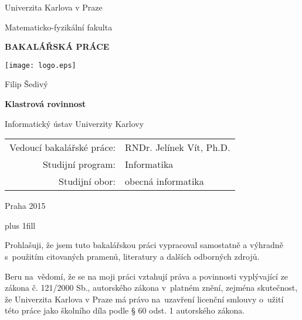 \documentclass[12pt,a4report]{report}
\theoremstyle{definition}
\begin{document}
\author{Filip Šedivý}
\begin{center}

\large

Univerzita Karlova v Praze

\medskip

Matematicko-fyzikální fakulta

\vfill

{\bf\Large BAKALÁŘSKÁ PRÁCE}

\vfill

\centerline{\mbox{\texttt{[image: logo.eps]}}}

\vfill
\vspace{5mm}

{\LARGE Filip Šedivý}

\vspace{15mm}

{\LARGE\bfseries Klastrová rovinnost}

\vfill

Informatický ústav Univerzity Karlovy

\vfill

\begin{tabular}{rl}

Vedoucí bakalářské práce: & RNDr. Jelínek Vít, Ph.D.\\
\noalign{\vspace{2mm}}
Studijní program: & Informatika \\
\noalign{\vspace{2mm}}
Studijní obor: & obecná informatika \\
\end{tabular}

\vfill

Praha 2015 

\end{center}

\newpage

\vglue 0pt plus 1fill

\noindent
Prohlašuji, že jsem tuto bakalářskou práci vypracoval samostatně a výhradně
s~použitím citovaných pramenů, literatury a dalších odborných zdrojů.

\medskip\noindent
Beru na~vědomí, že se na moji práci vztahují práva a povinnosti vyplývající
ze zákona č. 121/2000 Sb., autorského zákona v~platném znění, zejména skutečnost,
že Univerzita Karlova v Praze má právo na~uzavření licenční smlouvy o~užití této
práce jako školního díla podle § 60 odst. 1 autorského zákona.

\vspace{10mm}
\end{document}
